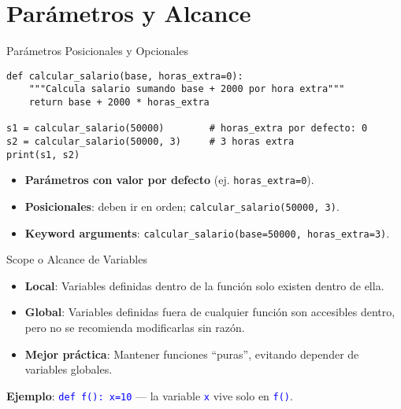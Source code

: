 \documentclass[10pt]{beamer}
\begin{document}
\section{Parámetros y Alcance}

\begin{frame}[fragile]{Parámetros Posicionales y Opcionales}
\begin{verbatim}
def calcular_salario(base, horas_extra=0):
    """Calcula salario sumando base + 2000 por hora extra"""
    return base + 2000 * horas_extra

s1 = calcular_salario(50000)        # horas_extra por defecto: 0
s2 = calcular_salario(50000, 3)     # 3 horas extra
print(s1, s2)
\end{verbatim}
\begin{itemize}
  \item \textbf{Parámetros con valor por defecto} (ej. \texttt{horas\_extra=0}).
  \item \textbf{Posicionales}: deben ir en orden; \texttt{calcular\_salario(50000, 3)}.
  \item \textbf{Keyword arguments}: \texttt{calcular\_salario(base=50000, horas\_extra=3)}.
\end{itemize}
\end{frame}

\begin{frame}{Scope o Alcance de Variables}
  \begin{itemize}
    \item \textbf{Local}: Variables definidas dentro de la función solo existen dentro de ella.
    \item \textbf{Global}: Variables definidas fuera de cualquier función son accesibles dentro, pero no se recomienda modificarlas sin razón.
    \item \textbf{Mejor práctica}: Mantener funciones “puras”, evitando depender de variables globales.
  \end{itemize}
  \vspace{0.2cm}
  \textbf{Ejemplo}: {\texttt{\textcolor{blue}{def f(): x=10}}} — la variable {\texttt{\textcolor{blue}{x}}} vive solo en {\texttt{\textcolor{blue}{f()}}}.
\end{frame}
\end{document}
